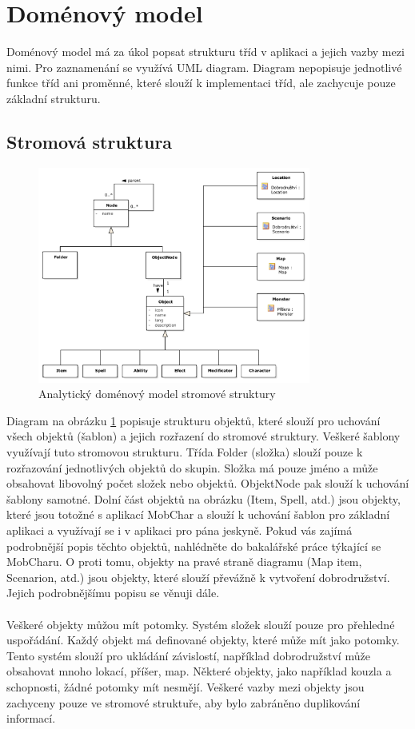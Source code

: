 \documentclass[thesis=B,czech]{resources/FITthesis}[2012/06/26]
\begin{document}
	\section{Doménový model}
Doménový model má za úkol popsat strukturu tříd v aplikaci a jejich vazby mezi nimi. Pro zaznamenání se využívá UML diagram. Diagram nepopisuje jednotlivé funkce tříd ani proměnné, které slouží k implementaci tříd, ale zachycuje pouze základní strukturu.
\subsection{Stromová struktura}
\begin{figure}\centering
	\includegraphics[width=0.8\textwidth]{images/domain_struktura}
	\caption[Analytický doménový model stromové struktury]{Analytický doménový model stromové struktury}\label{fig:dm_stromova_struktura}
\end{figure}
Diagram na obrázku \ref{fig:dm_stromova_struktura} popisuje strukturu objektů, které slouží pro uchování všech objektů (šablon) a jejich rozřazení do stromové struktury. Veškeré šablony využívají tuto stromovou strukturu. Třída Folder (složka) slouží pouze k rozřazování jednotlivých objektů do skupin. Složka má pouze jméno a může obsahovat libovolný počet složek nebo objektů. ObjektNode pak slouží k uchování šablony samotné. Dolní část objektů na obrázku (Item, Spell, atd.) jsou objekty, které jsou totožné s aplikací MobChar a slouží k uchování šablon pro základní aplikaci a využívají se i v aplikaci pro pána jeskyně. Pokud vás zajímá podrobnější popis těchto objektů, nahlédněte do bakalářské práce týkající se MobCharu. O proti tomu, objekty na pravé straně diagramu (Map item, Scenarion, atd.) jsou objekty, které slouží převážně k vytvoření dobrodružství. Jejich podrobnějšímu popisu se věnuji dále.\\
\\
Veškeré objekty můžou mít potomky. Systém složek slouží pouze pro přehledné uspořádání. Každý objekt má definované objekty, které může mít jako potomky. Tento systém slouží pro ukládání závislostí, například dobrodružství může obsahovat mnoho lokací, příšer, map. Některé objekty, jako například kouzla a schopnosti, žádné potomky mít nesmějí. Veškeré vazby mezi objekty jsou zachyceny pouze ve stromové struktuře, aby bylo zabráněno duplikování informací.
\end{document}
